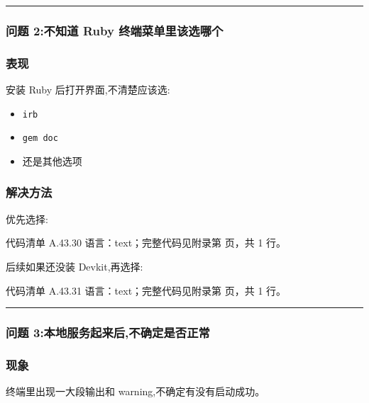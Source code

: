 \documentclass[lang=cn,scheme=chinese,color=blue,device=normal,toc=onecol,math=cm]{elegantbook}
\begin{document}
\medskip\hrule\medskip


\subsubsection{问题 2:不知道 Ruby 终端菜单里该选哪个}


\subsubsection{表现}


安装 Ruby 后打开界面,不清楚应该选:\par


\begin{itemize}
\item \texttt{irb}
\item \texttt{gem doc}
\item 还是其他选项
\end{itemize}


\subsubsection{解决方法}


优先选择:\par


\begin{codeindexbox}{代码清单 A.43.30}
语言：text；完整代码见附录第 \pageref{code:43:30} 页，共 1 行。
\end{codeindexbox}


后续如果还没装 Devkit,再选择:\par


\begin{codeindexbox}{代码清单 A.43.31}
语言：text；完整代码见附录第 \pageref{code:43:31} 页，共 1 行。
\end{codeindexbox}


\medskip\hrule\medskip


\subsubsection{问题 3:本地服务起来后,不确定是否正常}


\subsubsection{现象}


终端里出现一大段输出和 warning,不确定有没有启动成功。\par
\end{document}
